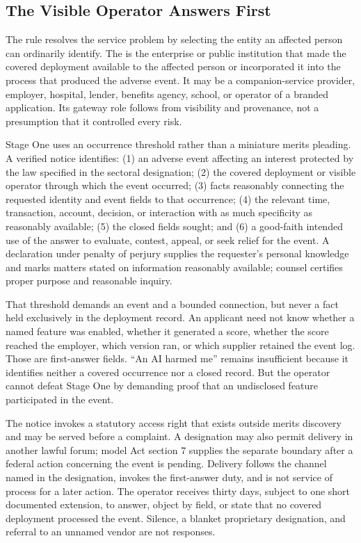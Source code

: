 \subsection{The Visible Operator Answers First}
\label{sec:gateway}

The rule resolves the service problem by selecting the entity an affected person can ordinarily identify. The  is the enterprise or public institution that made the covered deployment available to the affected person or incorporated it into the process that produced the adverse event. It may be a companion-service provider, employer, hospital, lender, benefits agency, school, or operator of a branded application. Its gateway role follows from visibility and provenance, not a presumption that it controlled every risk.

Stage One uses an occurrence threshold rather than a miniature merits pleading. A verified notice identifies: (1) an adverse event affecting an interest protected by the law specified in the sectoral designation; (2) the covered deployment or visible operator through which the event occurred; (3) facts reasonably connecting the requested identity and event fields to that occurrence; (4) the relevant time, transaction, account, decision, or interaction with as much specificity as reasonably available; (5) the closed fields sought; and (6) a good-faith intended use of the answer to evaluate, contest, appeal, or seek relief for the event. A declaration under penalty of perjury supplies the requester's personal knowledge and marks matters stated on information reasonably available; counsel certifies proper purpose and reasonable inquiry.

That threshold demands an event and a bounded connection, but never a fact held exclusively in the deployment record. An applicant need not know whether a named feature was enabled, whether it generated a score, whether the score reached the employer, which version ran, or which supplier retained the event log. Those are first-answer fields. ``An AI harmed me'' remains insufficient because it identifies neither a covered occurrence nor a closed record. But the operator cannot defeat Stage One by demanding proof that an undisclosed feature participated in the event.

The notice invokes a statutory access right that exists outside merits discovery and may be served before a complaint. A designation may also permit delivery in another lawful forum; model Act section 7 supplies the separate boundary after a federal action concerning the event is pending. Delivery follows the channel named in the designation, invokes the first-answer duty, and is not service of process for a later action. The operator receives thirty days, subject to one short documented extension, to answer, object by field, or state that no covered deployment processed the event. Silence, a blanket proprietary designation, and referral to an unnamed vendor are not responses.

